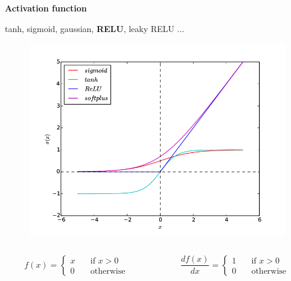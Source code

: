 \documentclass[xcolor=dvipsnames]{beamer}
\begin{document}
\begin{frame}[fragile]
{\bf Activation function}

tanh, sigmoid, gaussian, {\bf RELU}, leaky RELU ...
\begin{figure}
  \includegraphics[scale=0.2]{../../pictures/activation.png}
\end{figure}

\begin{columns}
\begin{column}{0.5\textwidth}
\[ f(x) =
  \begin{cases}
    x       & \quad \text{if } x > 0\\
    0       & \quad \text{otherwise}
  \end{cases}
\]
\end{column}
\begin{column}{0.5\textwidth}  %
\[ \frac{df(x)}{dx} =
  \begin{cases}
    1       & \quad \text{if } x > 0\\
    0       & \quad \text{otherwise}
  \end{cases}
\]
\end{column}
\end{columns}

\end{frame}
\end{document}
